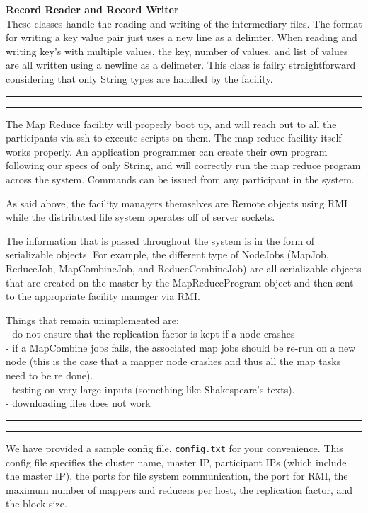 \documentclass[11pt]{article}
\newcommand{\question}[2] {\vspace{.25in} \hrule\vspace{0.5em}
\noindent{\bf #1: #2} \vspace{0.5em}
\hrule \vspace{.10in}}
\begin{document}
\textbf{Record Reader and Record Writer}
\\ These classes handle the reading and writing of the intermediary files. The format for writing a key value pair just uses a new line as a delimter. When reading and writing key's with multiple values, the key, number of values, and list of values are all written using a newline as a delimeter. This class is failry straightforward considering that only String types are handled by the facility.

\question{II} {Implementation}
The Map Reduce facility will properly boot up, and will reach out to all the participants via ssh to execute scripts on them. The map reduce facility itself works properly. An application programmer can create their own program following our specs of only String, and will correctly run the map reduce program across the system. Commands can be issued from any participant in the system.

As said above, the facility managers themselves are Remote objects using RMI while the distributed file system operates off of server sockets.

The information that is passed throughout the system is in the form of serializable objects. For example, the different type of NodeJobs (MapJob, ReduceJob, MapCombineJob, and ReduceCombineJob) are all serializable objects that are created on the master by the MapReduceProgram object and then sent to the appropriate facility manager via RMI.

Things that remain unimplemented are:
\\ - do not ensure that the replication factor is kept if a node crashes
\\ - if a MapCombine jobs fails, the associated map jobs should be re-run on a new node (this is the case that a mapper node crashes and thus all the map tasks need to be re done). 
\\ - testing on very large inputs (something like Shakespeare's texts).
\\ - downloading files does not work

\question{III} {Build, Deploy, and Run}

We have provided a sample config file, \texttt{config.txt} for your convenience. This config file specifies the cluster name, master IP, participant IPs (which include the master IP), the ports for file system communication, the port for RMI, the maximum number of mappers and reducers per host, the replication factor, and the block size.
\end{document}
